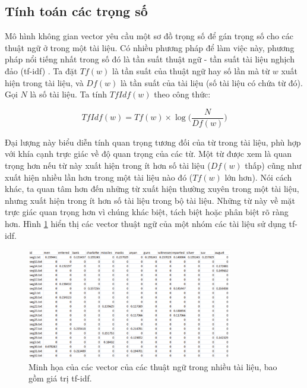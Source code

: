 \documentclass[14pt, a4paper]{article}
\numberwithin{equation}{section}
\numberwithin{figure}{section}
\numberwithin{dl}{section}
\numberwithin{md}{section}
\numberwithin{bd}{section}
\numberwithin{dn}{section}
\numberwithin{hq}{section}
\begin{document}
    \subsection{Tính toán các trọng số}

    Mô hình không gian vector yêu cầu một sơ đồ trọng số để gán trọng số cho các thuật ngữ ở trong một tài liệu.
    Có nhiều phương pháp để làm việc này, phương pháp nổi tiếng nhất trong số đó là tần suất thuật ngữ - tần suất tài liệu nghịch đảo (tf-idf) \cite{355}.
    Ta đặt $Tf(w)$ là tần suất của thuật ngữ hay số lần mà từ $w$ xuất hiện trong tài liệu, và $Df(w)$ là tần suất của tài liệu (số tài liệu có chứa từ đó).
    Gọi $N$ là số tài liệu. Ta tính $TfIdf(w)$ theo công thức:

    \begin{equation}
        TfIdf(w) = Tf(w) \times \log \Big( \dfrac{N}{Df(w)} \Big)
    \end{equation}

    Đại lượng này biểu diễn tính quan trọng tương đối của từ trong tài liệu, phù hợp với khía cạnh trực giác về độ quan trọng của các từ.
    Một từ được xem là quan trọng hơn nếu từ này xuất hiện trong ít hơn số tài liệu ($Df(w)$ thấp) cũng như xuất hiện nhiều lần hơn trong một tài liệu nào đó ($Tf(w)$ lớn hơn).
    Nói cách khác, ta quan tâm hơn đến những từ xuất hiện thường xuyên trong một tài liệu, nhưng xuất hiện trong ít hơn số tài liệu trong bộ tài liệu.
    Những từ này về mặt trực giác quan trọng hơn vì chúng khác biệt, tách biệt hoặc phân biệt rõ ràng hơn.
    Hình \ref{fig:1} hiển thị các vector thuật ngữ của một nhóm các tài liệu sử dụng tf-idf.

    \begin{figure}[h!]
        \centering
        \includegraphics[width=0.8\textwidth]{1.png}
        \caption{Minh họa của các vector của các thuật ngữ trong nhiều tài liệu, bao gồm giá trị tf-idf.}
        \label{fig:1}
    \end{figure}
\end{document}
